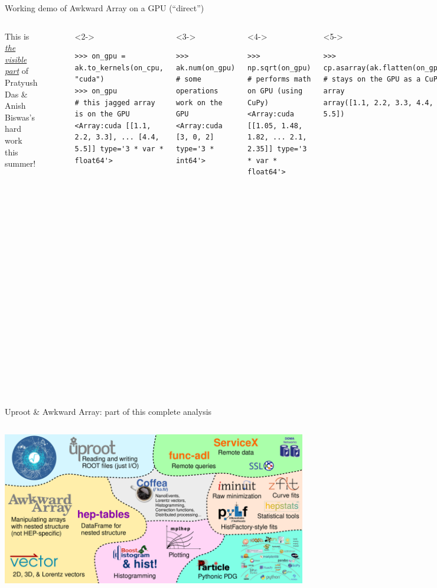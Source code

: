 \documentclass[aspectratio=169]{beamer}
\begin{document}
\begin{frame}[fragile]{Working demo of Awkward Array on a GPU (``direct'')}
\large
\vspace{0.5 cm}
\begin{columns}
This is \underline{\it the visible part} of Pratyush Das \& Anish Biswas's hard work this summer!

\small
\begin{verbatim}
>>> import awkward1 as ak, numpy as np, cupy as cp
\end{verbatim}
\begin{verbatim}
>>> on_cpu = ak.Array([[1.1, 2.2, 3.3], [], [4.4, 5.5]])
>>> on_cpu                           # this jagged array is on the CPU
<Array [[1.1, 2.2, 3.3], [], [4.4, 5.5]] type='3 * var * float64'>
\end{verbatim}
\begin{uncoverenv}<2->
\begin{verbatim}
>>> on_gpu = ak.to_kernels(on_cpu, "cuda")
>>> on_gpu                           # this jagged array is on the GPU
<Array:cuda [[1.1, 2.2, 3.3], ... [4.4, 5.5]] type='3 * var * float64'>
\end{verbatim}
\end{uncoverenv}
\begin{uncoverenv}<3->
\begin{verbatim}
>>> ak.num(on_gpu)                   # some operations work on the GPU
<Array:cuda [3, 0, 2] type='3 * int64'>
\end{verbatim}
\end{uncoverenv}
\begin{uncoverenv}<4->
\begin{verbatim}
>>> np.sqrt(on_gpu)                  # performs math on GPU (using CuPy)
<Array:cuda [[1.05, 1.48, 1.82, ... 2.1, 2.35]] type='3 * var * float64'>
\end{verbatim}
\end{uncoverenv}
\begin{uncoverenv}<5->
\begin{verbatim}
>>> cp.asarray(ak.flatten(on_gpu))   # stays on the GPU as a CuPy array
array([1.1, 2.2, 3.3, 4.4, 5.5])
\end{verbatim}
\end{uncoverenv}
\end{columns}
\end{frame}

\begin{frame}{Uproot \& Awkward Array: part of this complete analysis}
\vspace{0.17 cm}
\begin{columns}
\includegraphics[width=\linewidth]{part-of-this-complete.pdf}
\end{columns}
\end{frame}
\end{document}
